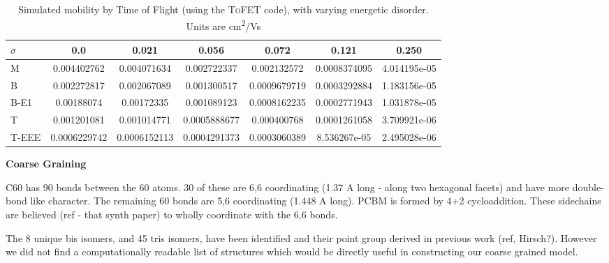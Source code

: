 \documentclass[journal=nanofd,manuscript=suppinfo]{achemso}
\begin{document}
\begin{table}
\centering
{}
\begin{tabular}{lSHSHSH}
\toprule
$\sigma$ & 0.0 & 0.021 & 0.056 & 0.072 & 0.121 & 0.250 \\
\midrule
 M  & 0.004402762    &  0.004071634      &  0.002722337      &  0.002132572      &  0.0008374095     &  4.014195e-05     \\
 B  & 0.002272817    &  0.002067089      &  0.001300517      &  0.0009679719     &  0.0003292884     &  1.183156e-05     \\
 B-E1  & 0.00188074      &  0.00172335   &  0.001089123      &  0.0008162235     &  0.0002771943     &  1.031878e-05     \\
 T  & 0.001201081    &  0.001014771      &  0.0005888677     &  0.000400768      &  0.0001261058     &  3.709921e-06     \\
 T-EEE  & 0.0006229742   &  0.0006152113     &  0.0004291373     &  0.0003060389     &  8.536267e-05     &  2.495028e-06 \\
\bottomrule
\end{tabular}
\caption{\label{tab:mobs}
Simulated mobility by Time of Flight (using the \textsc{ToFET} code), with varying energetic disorder. Units are \si{cm^2/Vs}}
\end{table}

\textbf{Coarse Graining}

C60 has 90 bonds between the 60 atoms. 30 of these are 6,6 coordinating (1.37
A long - along two hexagonal facets) and have more double-bond like character.
The remaining 60 bonds are 5,6 coordinating (1.448 A long). PCBM is formed by
4+2 cycloaddition.
These sidechains are believed (ref - that synth paper) to
wholly coordinate with the 6,6 bonds.

The 8 unique bis isomers, and 45 tris isomers, have been identified and their
point group derived in previous work (ref, Hirsch?).
However we did not find a computationally readable list of structures which
would be directly useful in constructing our coarse grained model.
\end{document}
